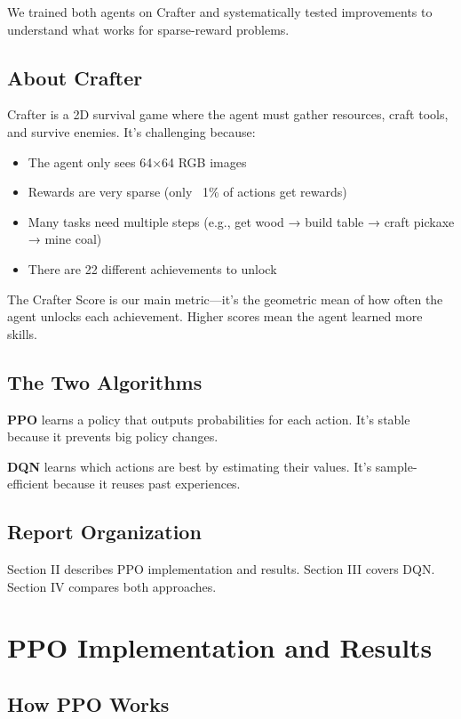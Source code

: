 \documentclass[conference]{IEEEtran}
\begin{document}
We trained both agents on Crafter and systematically tested improvements to understand what works for sparse-reward problems.

\subsection{About Crafter}

Crafter is a 2D survival game where the agent must gather resources, craft tools, and survive enemies. It's challenging because:

\begin{itemize}
    \item The agent only sees 64×64 RGB images
    \item Rewards are very sparse (only ~1\% of actions get rewards)
    \item Many tasks need multiple steps (e.g., get wood → build table → craft pickaxe → mine coal)
    \item There are 22 different achievements to unlock
\end{itemize}

The Crafter Score is our main metric—it's the geometric mean of how often the agent unlocks each achievement. Higher scores mean the agent learned more skills.

\subsection{The Two Algorithms}

\textbf{PPO} learns a policy that outputs probabilities for each action. It's stable because it prevents big policy changes.

\textbf{DQN} learns which actions are best by estimating their values. It's sample-efficient because it reuses past experiences.

\subsection{Report Organization}

Section II describes PPO implementation and results. Section III covers DQN. Section IV compares both approaches.

\section{PPO Implementation and Results}

\subsection{How PPO Works}
\end{document}
